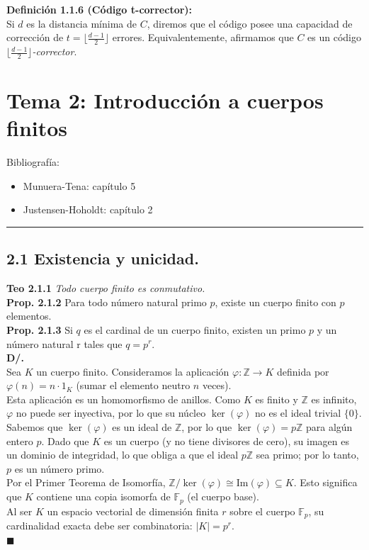 \documentclass{article}
\newcommand{\hlinecolor}{\noindent\textcolor{azuloscuro}{\rule{\textwidth}{1pt}}}
\begin{document}
\textbf{Definición 1.1.6 (Código t-corrector):}\\
Si $d$ es la distancia mínima de $C$, diremos que el código posee una capacidad de corrección de $t = \lfloor\frac{d-1}{2}\rfloor$ errores. Equivalentemente, afirmamos que $C$ es un código \textit{$\lfloor\frac{d-1}{2}\rfloor$-corrector}.\newpage

\section{Tema 2: Introducción a cuerpos finitos}
Bibliografía:
\begin{itemize}
\item Munuera-Tena: capítulo 5
\item Justensen-Hoholdt: capítulo 2
\end{itemize}
\hlinecolor{}

\subsection{2.1 Existencia y unicidad.}

\textbf{Teo 2.1.1} 
\textit{Todo cuerpo finito es conmutativo.} \\

\textbf{Prop. 2.1.2} 
Para todo número natural primo $p$, existe un cuerpo finito con  $p$ elementos.  \\

\textbf{Prop. 2.1.3}
Si $q$ es el cardinal de un cuerpo finito, existen un primo $p$  y un número natural r tales que $q = p^r$. \\

\textbf{D/. }\\
Sea $K$ un cuerpo finito. Consideramos la aplicación $\varphi: \mathbb{Z} \to K$ definida por $\varphi(n) = n \cdot 1_K$ (sumar el elemento neutro $n$ veces). \\
Esta aplicación es un homomorfismo de anillos. Como $K$ es finito y $\mathbb{Z}$ es infinito, $\varphi$ no puede ser inyectiva, por lo que su núcleo $\ker(\varphi)$ no es el ideal trivial $\{0\}$. \\
Sabemos que $\ker(\varphi)$ es un ideal de $\mathbb{Z}$, por lo que $\ker(\varphi) = p\mathbb{Z}$ para algún entero $p$. Dado que $K$ es un cuerpo (y no tiene divisores de cero), su imagen es un dominio de integridad, lo que obliga a que el ideal $p\mathbb{Z}$ sea primo; por lo tanto, $p$ es un número primo. \\
Por el Primer Teorema de Isomorfía, $\mathbb{Z}/\ker(\varphi) \cong \text{Im}(\varphi) \subseteq K$. Esto significa que $K$ contiene una copia isomorfa de $\mathbb{F}_p$ (el cuerpo base). \\
Al ser $K$ un espacio vectorial de dimensión finita $r$ sobre el cuerpo $\mathbb{F}_p$, su cardinalidad exacta debe ser combinatoria: $|K| = p^r$.\\
 $\blacksquare$
\end{document}

